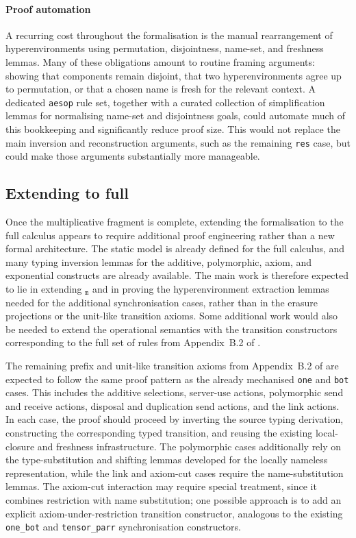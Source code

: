 \paragraph{Proof automation}
A recurring cost throughout the formalisation is the manual rearrangement of hyperenvironments using permutation, disjointness, name-set, and freshness lemmas. Many of these obligations amount to routine framing arguments: showing that components remain disjoint, that two hyperenvironments agree up to permutation, or that a chosen name is fresh for the relevant context. A dedicated \texttt{aesop} rule set, together with a curated collection of simplification lemmas for normalising name-set and disjointness goals, could automate much of this bookkeeping and significantly reduce proof size. This would not replace the main inversion and reconstruction arguments, such as the remaining \texttt{res} case, but could make those arguments substantially more manageable.

\subsection{Extending to full \texorpdfstring{\pill{}}{PiLL}}
Once the multiplicative fragment is complete, extending the formalisation to the full \pill{} calculus appears to require additional proof engineering rather than a new formal architecture. The static model is already defined for the full calculus, and many typing inversion lemmas for the additive, polymorphic, axiom, and exponential constructs are already available. The main work is therefore expected to lie in extending $_{\texttt{m}}$ and in proving the hyperenvironment extraction lemmas needed for the additional synchronisation cases, rather than in the erasure projections or the unit-like transition axioms. Some additional work would also be needed to extend the operational semantics with the transition constructors corresponding to the full set of rules from Appendix~B.2 of \citet{abs-2106-11818}.

The remaining prefix and unit-like transition axioms from Appendix~B.2 of \citet{abs-2106-11818} are expected to follow the same proof pattern as the already mechanised \texttt{one} and \texttt{bot} cases. This includes the additive selections, server-use actions, polymorphic send and receive actions, disposal and duplication send actions, and the link actions. In each case, the proof should proceed by inverting the source typing derivation, constructing the corresponding typed transition, and reusing the existing local-closure and freshness infrastructure. The polymorphic cases additionally rely on the type-substitution and shifting lemmas developed for the locally nameless representation, while the link and axiom-cut cases require the name-substitution lemmas. The axiom-cut interaction may require special treatment, since it combines restriction with name substitution; one possible approach is to add an explicit axiom-under-restriction transition constructor, analogous to the existing \texttt{one\_bot} and \texttt{tensor\_parr} synchronisation constructors.

